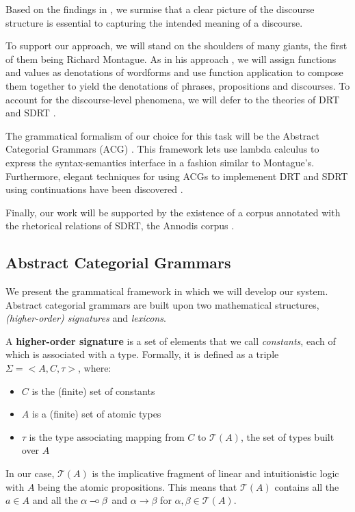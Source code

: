 \documentclass{article}
\def\limp {\mathbin{{-}\mkern-3.5mu{\circ}}}
\begin{document}
Based on the findings in \cite{asher2003logics}, we surmise that a clear
picture of the discourse structure is essential to capturing the
intended meaning of a discourse.

To support our approach, we will stand on the shoulders of many giants,
the first of them being Richard Montague. As in his approach
\cite{montague1973proper}, we will assign functions and values as
denotations of wordforms and use function application to compose them
together to yield the denotations of phrases, propositions and
discourses. To account for the discourse-level phenomena, we will defer
to the theories of DRT \cite{kamp1993discourse} and SDRT
\cite{asher2003logics}.

The grammatical formalism of our choice for this task will be the
Abstract Categorial Grammars (ACG) \cite{de2001towards}. This framework
lets use lambda calculus to express the syntax-semantics interface in a
fashion similar to Montague's. Furthermore, elegant techniques for using
ACGs to implemenent DRT and SDRT using continuations have been
discovered \cite{de2006towards} \cite{asher2011sdrt}
\cite{asher2011montagovian}.

Finally, our work will be supported by the existence of a corpus
annotated with the rhetorical relations of SDRT, the Annodis corpus
\cite{afantenos2012empirical}.


\subsection{Abstract Categorial Grammars}

We present the grammatical framework in which we will develop our
system. Abstract categorial grammars are built upon two mathematical
structures, \emph{(higher-order) signatures} and \emph{lexicons}.

A \textbf{higher-order signature} is a set of elements that we call
\emph{constants}, each of which is associated with a type. Formally, it
is defined as a triple $\Sigma = \mathopen{<}A, C, \tau\mathclose{>}$,
where:
\begin{itemize}
  \item $C$ is the (finite) set of constants
  \item $A$ is a (finite) set of atomic types
  \item $\tau$ is the type associating mapping from $C$ to $\mathcal{T}(A)$,
    the set of types built over $A$
\end{itemize}

In our case, $\mathcal{T}(A)$ is the implicative fragment of linear and
intuitionistic logic with $A$ being the atomic propositions. This means
that $\mathcal{T}(A)$ contains all the $a \in A$ and all the $\alpha \limp
\beta$ and $\alpha \to \beta$ for $\alpha, \beta \in \mathcal{T}(A)$.
\end{document}
